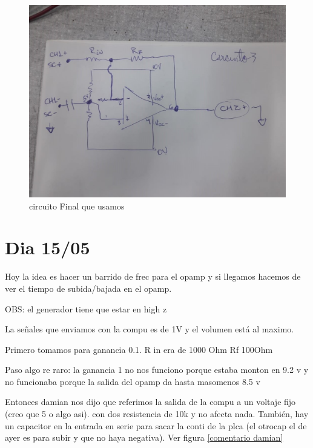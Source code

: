 \documentclass[a4paper,12pt]{article}
\begin{document}
\begin{figure}[H]
\centering
     \includegraphics[scale=0.40]{Circuitofinal.jpeg}
     \caption{circuito Final que usamos}
     \label{cir_final}
\end{figure}

\section{Dia 15/05}

Hoy la idea es hacer un barrido de frec para el opamp y si llegamos hacemos de ver el tiempo de subida/bajada en el opamp. 

OBS: el generador tiene que estar en high z

La señales que enviamos con la compu es de 1V y el volumen está al maximo. 


Primero tomamos para ganancia 0.1. 
R in era de 1000 Ohm
Rf 100Ohm


Paso algo re raro: la ganancia 1 no nos funciono porque estaba monton en 9.2 v y no funcionaba porque la salida del opamp da hasta masomenos 8.5 v

Entonces damian nos dijo que referimos la salida de la compu a un voltaje fijo (creo que 5 o algo asi).   con dos resistencia de 10k y no afecta nada. También, hay un capacitor en la entrada en serie para sacar la conti de la plca (el otrocap el de ayer es para subir y que no haya negativa). Ver figura \ref{comentario damian}
\end{document}

